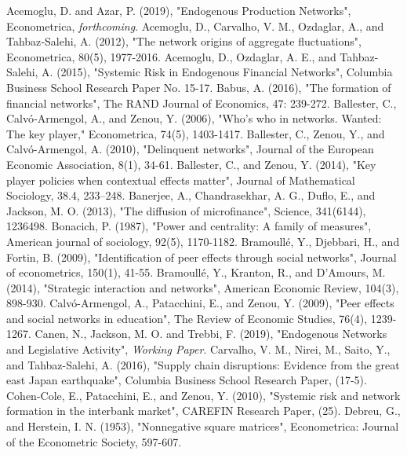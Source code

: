 \documentclass[12pt]{article}
\theoremstyle{definition}
\begin{document}
\begin{thebibliography}{99}
	Acemoglu, D. and Azar, P. (2019),
	"Endogenous Production Networks",
	Econometrica, \textit{forthcoming}.
	Acemoglu, D., Carvalho, V. M., Ozdaglar, A., and Tahbaz‐Salehi, A. (2012),
	"The network origins of aggregate fluctuations",
	Econometrica, 80(5), 1977-2016.
	Acemoglu, D., Ozdaglar, A. E., and Tahbaz-Salehi, A. (2015),
	"Systemic Risk in Endogenous Financial Networks",
	Columbia Business School Research Paper No. 15-17.
	Babus, A. (2016),
	"The formation of financial networks",
	The RAND Journal of Economics, 47: 239-272.
	Ballester, C., Calv\'{o}‐Armengol, A., and Zenou, Y. (2006),
	"Who's who in networks. Wanted: The key player,"
	Econometrica, 74(5), 1403-1417.
	Ballester, C., Zenou, Y., and Calv\'{o}-Armengol, A. (2010),
	"Delinquent networks",
	Journal of the European Economic Association, 8(1), 34-61.
	Ballester, C., and Zenou, Y. (2014),
	"Key player policies when contextual effects matter",
	Journal of Mathematical Sociology, 38.4, 233–248.
	Banerjee, A., Chandrasekhar, A. G., Duflo, E., and Jackson, M. O. (2013),
	"The diffusion of microfinance",
	Science, 341(6144), 1236498.
	Bonacich, P. (1987),
	"Power and centrality: A family of measures",
	American journal of sociology, 92(5), 1170-1182.
	Bramoull\'{e}, Y., Djebbari, H., and Fortin, B. (2009),
	"Identification of peer effects through social networks",
	Journal of econometrics, 150(1), 41-55.
	Bramoull\'{e}, Y., Kranton, R., and D'Amours, M. (2014),
	"Strategic interaction and networks",
	American Economic Review, 104(3), 898-930.
	Calv\'{o}-Armengol, A., Patacchini, E., and Zenou, Y. (2009),
	"Peer effects and social networks in education",
	The Review of Economic Studies, 76(4), 1239-1267.
	Canen, N., Jackson, M. O. and Trebbi, F. (2019),
	"Endogenous Networks and Legislative Activity",
	\textit{Working Paper}.
	Carvalho, V. M., Nirei, M., Saito, Y., and Tahbaz-Salehi, A. (2016),
	"Supply chain disruptions: Evidence from the great east Japan earthquake",
	Columbia Business School Research Paper, (17-5).
	Cohen-Cole, E., Patacchini, E., and Zenou, Y. (2010),
	"Systemic risk and network formation in the interbank market",
	CAREFIN Research Paper, (25).
	Debreu, G., and Herstein, I. N. (1953),
	"Nonnegative square matrices",
	Econometrica: Journal of the Econometric Society, 597-607.

\end{thebibliography}
\end{document}
